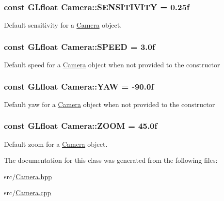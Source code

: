 \subsubsection[{\texorpdfstring{S\+E\+N\+S\+I\+T\+I\+V\+I\+TY}{SENSITIVITY}}]{\setlength{\rightskip}{0pt plus 5cm}const G\+Lfloat Camera\+::\+S\+E\+N\+S\+I\+T\+I\+V\+I\+TY = 0.\+25f\hspace{0.3cm}{\ttfamily [static]}}\hypertarget{classCamera_adee09ae2133f9fe95a6eb72a6cb8db20}{}\label{classCamera_adee09ae2133f9fe95a6eb72a6cb8db20}
Default sensitivity for a \hyperlink{classCamera}{Camera} object. 
\subsubsection[{\texorpdfstring{S\+P\+E\+ED}{SPEED}}]{\setlength{\rightskip}{0pt plus 5cm}const G\+Lfloat Camera\+::\+S\+P\+E\+ED = 3.\+0f\hspace{0.3cm}{\ttfamily [static]}}\hypertarget{classCamera_acc2ddbb4a3bdb2829896703edf72ca1e}{}\label{classCamera_acc2ddbb4a3bdb2829896703edf72ca1e}
Default speed for a \hyperlink{classCamera}{Camera} object when not provided to the constructor 
\subsubsection[{\texorpdfstring{Y\+AW}{YAW}}]{\setlength{\rightskip}{0pt plus 5cm}const G\+Lfloat Camera\+::\+Y\+AW = -\/90.\+0f\hspace{0.3cm}{\ttfamily [static]}}\hypertarget{classCamera_a79050e94e98c5c1cc0127c41edb4ed16}{}\label{classCamera_a79050e94e98c5c1cc0127c41edb4ed16}
Default yaw for a \hyperlink{classCamera}{Camera} object when not provided to the constructor 
\subsubsection[{\texorpdfstring{Z\+O\+OM}{ZOOM}}]{\setlength{\rightskip}{0pt plus 5cm}const G\+Lfloat Camera\+::\+Z\+O\+OM = 45.\+0f\hspace{0.3cm}{\ttfamily [static]}}\hypertarget{classCamera_a34cdfe4c17868880037d5ff78159f158}{}\label{classCamera_a34cdfe4c17868880037d5ff78159f158}
Default zoom for a \hyperlink{classCamera}{Camera} object. 

The documentation for this class was generated from the following files\+:\begin{DoxyCompactItemize}
\item 
src/\hyperlink{Camera_8hpp}{Camera.\+hpp}\item 
src/\hyperlink{Camera_8cpp}{Camera.\+cpp}\end{DoxyCompactItemize}
